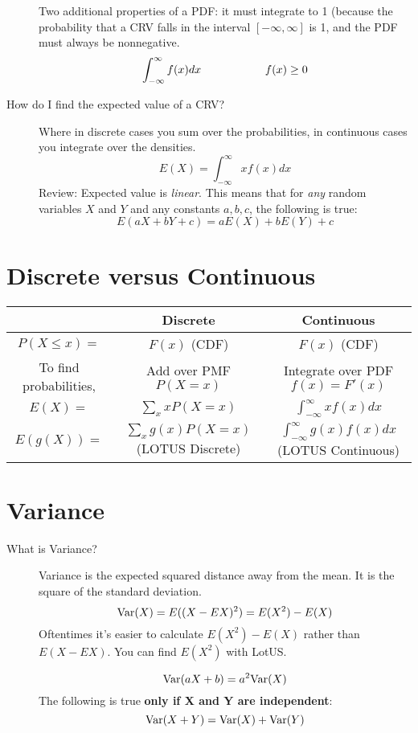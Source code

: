 \documentclass[11.5pt]{article}
\begin{document}
\begin{notes}
\begin{description}
Two additional properties of a PDF:  it must integrate to 1 (because the probability that a CRV falls in the interval $[-\infty, \infty]$ is 1, and the PDF must always be nonnegative.
\[\int^\infty_{-\infty}f(x)dx \hspace{2 cm} f(x) \geq 0\]
\item[How do I find the expected value of a CRV?] Where in discrete cases you sum over the probabilities, in continuous cases you integrate over the densities.
\[E(X) = \int^\infty_{-\infty}xf(x)dx \]
Review: Expected value is \emph{linear}. This means that for \emph{any} random variables $X$ and $Y$ and any constants $a, b, c$, the following is true:
\[E(aX + bY + c) = aE(X) + bE(Y) + c\]
\end{description}

\section*{Discrete versus Continuous}
\begin{table}[htb!] \begin{center}
	\begin{tabular}{ccc}
	\toprule
		~ & \textbf{Discrete} & \textbf{Continuous} \\ \midrule
		$P(X \leq x) = $  & $F(x)$ (CDF) & $F(x)$ (CDF) \\ 
		To find probabilities, & Add over PMF $P(X = x)$ & Integrate over PDF $f(x) = F'(x)$ \\ 
		$E(X) =$ & $\sum_x xP(X=x)$ & $\int_{-\infty}^{\infty}xf(x)dx$ \\ 
		$E(g(X)) =$ & $\sum_x g(x)P(X=x)$ (LOTUS Discrete) & $\int_{-\infty}^{\infty} g(x)f(x)dx$ (LOTUS Continuous)
	\end{tabular}\end{center}
\end{table}


\section*{Variance}
\begin{description}
\item[What is Variance?] Variance is the expected squared distance away from the mean. It is the square of the standard deviation.
\[\textrm{Var}(X) = E((X - EX)^2) = E(X^2) - E(X) \]
Oftentimes it's easier to calculate $E(X^2) - E(X)$ rather than $E(X - EX)$. You can find $E(X^2)$ with LotUS.

\[\textrm{Var}(aX + b) = a^2\textrm{Var}(X)\]
The following is true \textbf{only if X and Y are independent}:
\[\textrm{Var}(X + Y) = \textrm{Var}(X) + \textrm{Var}(Y)\]
\end{description}



\end{notes}
\end{document}
